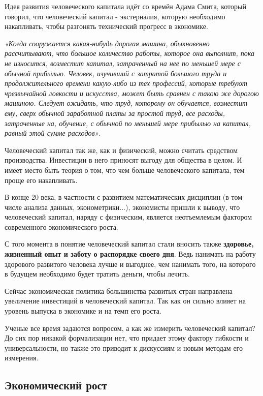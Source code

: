 \documentclass[reqno]{article}
\theoremstyle{definition}
\theoremstyle{definition}
\theoremstyle{definition}
\theoremstyle{definition}
\theoremstyle{definition}
\theoremstyle{definition}
\theoremstyle{definition}
\theoremstyle{definition}
\theoremstyle{definition}
\begin{document}
			Идея развития человеческого капитала идёт со времён Адама Смита, который говорил, что человеческий капитал - экстерналия, которую необходимо накапливать, чтобы разгонять технический прогресс в экономике.
			
			\begin{center}
				\emph{«Когда сооружается какая-нибудь дорогая машина, обыкновенно рассчитывают, что большое количество работы, которое она выполнит, пока не износится, возместит капитал, затраченный на нее по меньшей мере с обычной прибылью. Человек, изучивший с затратой большого труда и продолжительного времени какую-либо из тех профессий, которые требуют чрезвычайной ловкости и искусства, может быть сравнен с такою же дорогою машиною. Следует ожидать, что труд, которому он обучается, возместит ему, сверх обычной заработной платы за простой труд, все расходы, затраченные на, обучение, с обычной по меньшей мере прибылью на капитал, равный этой сумме расходов»}.
			\end{center}
			
			Человеческий капитал так же, как и физический, можно считать средством производства. Инвестиции в него приносят выгоду для общества в целом. И имеет место быть теория о том, что чем больше человеческого капитала, тем проще его накапливать. 
			
			В конце 20 века, в частности с развитием математических дисциплин (в том числе анализа данных, эконометрики...), экономисты пришли к выводу, что человеческий капитал, наряду с физическим, является неотъемлемым фактором современного экономического роста.
			
			С того момента в понятие человеческий капитал стали вносить также \textbf{здоровье, жизненный опыт и заботу о распорядке своего дня}. Ведь нанимать на работу здорового развитого человека лучше и выгоднее, чем нанимать того, на которого в будущем необходимо будет тратить деньги, чтобы лечить.
			
			Сейчас экономическая политика большинства развитых стран направлена увеличение инвестиций в человеческий капитал. Так как он сильно влияет на уровень выпуска в экономике и на темп его роста.  
			
			Ученые все время задаются вопросом, а как же измерить человеческий капитал? До сих пор никакой формализации нет, что придает этому фактору гибкости и универсальности, но также это приводит к дискуссиям и новым методам его измерения. 
		
		\subsection{Экономический рост}\label{sec:1.2}
		
\end{document}
